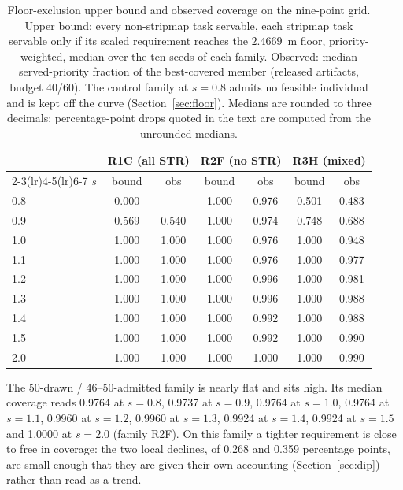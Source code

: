 \documentclass[preprint,authoryear]{elsarticle}
\begin{document}
\begin{table}[t]
\centering
\caption{Floor-exclusion upper bound and observed coverage on the nine-point grid. Upper bound: every non-stripmap task servable, each stripmap task servable only if its scaled requirement reaches the $2.4669$~m floor, priority-weighted, median over the ten seeds of each family. Observed: median served-priority fraction of the best-covered member (released artifacts, budget 40/60). The control family at $s=0.8$ admits no feasible individual and is kept off the curve (Section~\ref{sec:floor}). Medians are rounded to three decimals; percentage-point drops quoted in the text are computed from the unrounded medians.}
\label{tab:modes}
\begin{tabular}{lcccccc}
\toprule
 & \multicolumn{2}{c}{R1C (all STR)} & \multicolumn{2}{c}{R2F (no STR)} & \multicolumn{2}{c}{R3H (mixed)} \\
\cmidrule(lr){2-3}\cmidrule(lr){4-5}\cmidrule(lr){6-7}
$s$ & bound & obs & bound & obs & bound & obs \\
\midrule
0.8 & 0.000 & --- & 1.000 & 0.976 & 0.501 & 0.483 \\
0.9 & 0.569 & 0.540 & 1.000 & 0.974 & 0.748 & 0.688 \\
1.0 & 1.000 & 1.000 & 1.000 & 0.976 & 1.000 & 0.948 \\
1.1 & 1.000 & 1.000 & 1.000 & 0.976 & 1.000 & 0.977 \\
1.2 & 1.000 & 1.000 & 1.000 & 0.996 & 1.000 & 0.981 \\
1.3 & 1.000 & 1.000 & 1.000 & 0.996 & 1.000 & 0.988 \\
1.4 & 1.000 & 1.000 & 1.000 & 0.992 & 1.000 & 0.988 \\
1.5 & 1.000 & 1.000 & 1.000 & 0.992 & 1.000 & 0.990 \\
2.0 & 1.000 & 1.000 & 1.000 & 1.000 & 1.000 & 0.990 \\
\bottomrule
\end{tabular}
\end{table}


The 50-drawn / 46--50-admitted family is nearly flat and sits high. Its median coverage reads 0.9764 at $s=0.8$, 0.9737 at $s=0.9$, 0.9764 at $s=1.0$, 0.9764 at $s=1.1$, 0.9960 at $s=1.2$, 0.9960 at $s=1.3$, 0.9924 at $s=1.4$, 0.9924 at $s=1.5$ and 1.0000 at $s=2.0$ (family R2F). On this family a tighter requirement is close to free in coverage: the two local declines, of 0.268 and 0.359 percentage points, are small enough that they are given their own accounting (Section~\ref{sec:dip}) rather than read as a trend.
\end{document}
